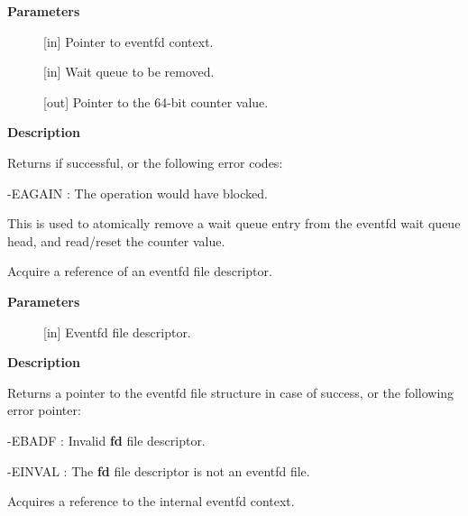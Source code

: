 \documentclass[a4paper,8pt,english]{sphinxmanual}
\begin{document}
\textbf{Parameters}
\begin{description}
\item[{}] \leavevmode
{[}in{]} Pointer to eventfd context.

\item[{}] \leavevmode
{[}in{]} Wait queue to be removed.

\item[{}] \leavevmode
{[}out{]} Pointer to the 64-bit counter value.

\end{description}

\textbf{Description}

Returns  if successful, or the following error codes:
\begin{optionlist}{3cm}
\item [-EAGAIN]  
: The operation would have blocked.
\end{optionlist}

This is used to atomically remove a wait queue entry from the eventfd wait
queue head, and read/reset the counter value.

\begin{fulllineitems}
\label{filesystems/index:c.eventfd_fget}
Acquire a reference of an eventfd file descriptor.

\end{fulllineitems}


\textbf{Parameters}
\begin{description}
\item[{}] \leavevmode
{[}in{]} Eventfd file descriptor.

\end{description}

\textbf{Description}

Returns a pointer to the eventfd file structure in case of success, or the
following error pointer:
\begin{optionlist}{3cm}
\item [-EBADF]  
: Invalid \textbf{fd} file descriptor.
\item [-EINVAL]  
: The \textbf{fd} file descriptor is not an eventfd file.
\end{optionlist}

\begin{fulllineitems}
\label{filesystems/index:c.eventfd_ctx_fdget}
Acquires a reference to the internal eventfd context.

\end{fulllineitems}
\end{document}
